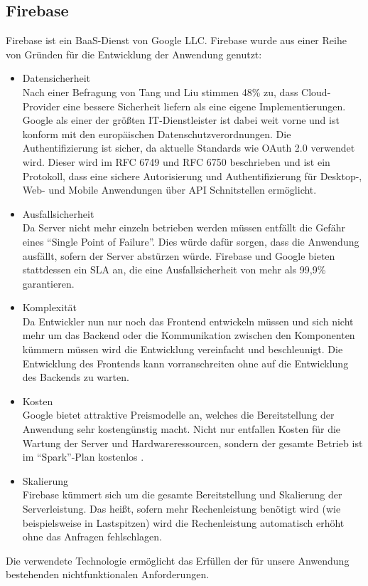 \subsection{Firebase}
Firebase ist ein \ac{BaaS}-Dienst von Google LLC.
Firebase wurde aus einer Reihe von Gründen für die Entwicklung der Anwendung genutzt:
\begin{itemize}
    \item Datensicherheit\\
        Nach einer Befragung von Tang und Liu stimmen 48\% zu, dass Cloud-Provider eine bessere Sicherheit liefern als eine eigene Implementierungen.\autocite[S. 63]{TANG}
        Google als einer der größten IT-Dienstleister ist dabei weit vorne und ist konform mit den europäischen Datenschutzverordnungen.\autocite{firebaseDataprotection}
        Die Authentifizierung ist sicher, da aktuelle Standards wie OAuth 2.0 verwendet wird. Dieser wird im RFC 6749 und RFC 6750 beschrieben und ist ein Protokoll, dass eine sichere Autorisierung und Authentifizierung für Desktop-, Web- und Mobile Anwendungen über API Schnitstellen ermöglicht. 
    \item Ausfallsicherheit\\
        Da Server nicht mehr einzeln betrieben werden müssen entfällt die Gefähr eines \enquote{Single Point of Failure}. %
        Dies würde dafür sorgen, dass die Anwendung ausfällt, sofern der Server abstürzen würde.
        Firebase und Google bieten stattdessen ein \ac{SLA} an, die eine Ausfallsicherheit von mehr als 99,9\% garantieren.\autocite{firebaseSLA}
    \item Komplexität\\
        Da Entwickler nun nur noch das Frontend entwickeln müssen und sich nicht mehr um das Backend oder die Kommunikation zwischen den Komponenten kümmern müssen wird die Entwicklung vereinfacht und beschleunigt.
        Die Entwicklung des Frontends kann vorranschreiten ohne auf die Entwicklung des Backends zu warten.
    \item Kosten \\
        Google bietet attraktive Preismodelle an, welches die Bereitstellung der Anwendung sehr kostengünstig macht.
        Nicht nur entfallen Kosten für die Wartung der Server und Hardwareressourcen, sondern der gesamte Betrieb ist im \enquote{Spark}-Plan kostenlos \autocite{firebasePrice}.
    \item Skalierung \\
        Firebase kümmert sich um die gesamte Bereitstellung und Skalierung der Serverleistung.
        Das heißt, sofern mehr Rechenleistung benötigt wird (wie beispielsweise in Lastspitzen) wird die Rechenleistung automatisch erhöht ohne das Anfragen fehlschlagen.
\end{itemize}
Die verwendete Technologie ermöglicht das Erfüllen der für unsere Anwendung bestehenden nichtfunktionalen Anforderungen.



